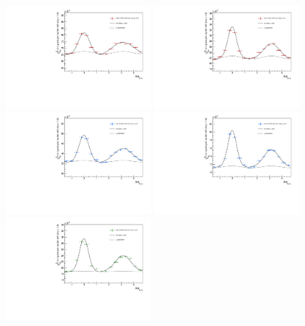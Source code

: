 \begin{figure}[ht]
    \centering
    \includegraphics[width=0.48\textwidth]{figures/analysis/h_lambda_dphi_von_0_20_lowpt.pdf}
    \includegraphics[width=0.48\textwidth]{figures/analysis/h_lambda_dphi_von_0_20_highpt.pdf}
    \includegraphics[width=0.48\textwidth]{figures/analysis/h_lambda_dphi_von_20_50_lowpt.pdf}
    \includegraphics[width=0.48\textwidth]{figures/analysis/h_lambda_dphi_von_20_50_highpt.pdf}
    \includegraphics[width=0.48\textwidth]{figures/analysis/h_lambda_dphi_von_50_80_lowpt.pdf}

\end{figure}
